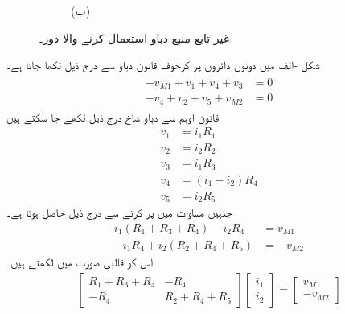 \begin{figure}
\begin{subfigure}{1\textwidth}
%
\caption*{(ب)}
\end{subfigure}%
\caption{غیر تابع منبع دباو استعمال کرنے والا دور۔}
\label{شکل_جوڑ_آزاد_منبع_دباو_دائری_مثال}
\end{figure}

شکل -الف میں دونوں دائروں پر کرخوف قانون دباو سے درج ذیل لکھا جاتا ہے۔
\begin{gather}
\begin{aligned}\label{مساوات_جوڑ_دائری_آزاد_منبع_الف}
-v_{M1}+v_1+v_4+v_3&=0\\
-v_4+v_2+v_5+v_{M2}&=0
\end{aligned}
\end{gather}
قانون اوہم سے دباو شاخ درج ذیل لکھے جا سکتے ہیں
\begin{align*}
v_1&=i_1 R_1\\
v_2&=i_2 R_2\\
v_3&=i_1 R_3\\
v_4&=(i_1-i_2)R_4\\
v_5&=i_2 R_5
\end{align*}
جنہیں مساوات  میں پر کرنے سے درج ذیل حاصل ہوتا ہے۔
\begin{align*}
i_1(R_1+R_3+R_4)-i_2 R_4&=v_{M1}\\
-i_1 R_4+i_2(R_2+R_4+R_5)&=-v_{M2}
\end{align*}
اس کو قالبی صورت میں لکھتے ہیں۔
\begin{align}
\begin{bmatrix}
R_1+R_3+R_4 & -R_4\\
-R_4& R_2+R_4+R_5
\end{bmatrix}
\begin{bmatrix}
i_1\\
i_2
\end{bmatrix}
=
\begin{bmatrix}
v_{M1}\\-v_{M2}
\end{bmatrix}
\end{align}


